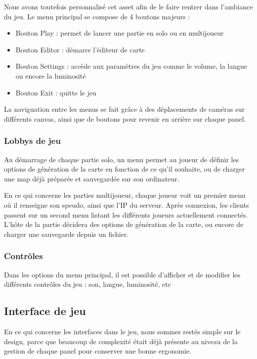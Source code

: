 \documentclass[12pt]{report}
\begin{document}
Nous avons toutefois personnalisé cet asset afin de le faire rentrer dans
l'ambiance du jeu. Le menu principal se compose de 4 boutons majeurs :

\begin{itemize}
    \item Bouton Play : permet de lancer une partie en solo ou en multijoueur
    \item Bouton Editor : démarre l'éditeur de carte
    \item Bouton Settings : accède aux paramètres du jeu comme le volume, la
        langue ou encore la luminosité
    \item Bouton Exit : quitte le jeu
\end{itemize}

La naviguation entre les menus se fait grâce à des déplacements de caméras sur
différents canvas, ainsi que de boutons pour revenir en arrière sur chaque
panel.

\subsubsection{Lobbys de jeu}

Au démarrage de chaque partie solo, un menu permet au joueur de définir les
options de génération de la carte en fonction de ce qu’il souhaite, ou de
charger une map déjà préparée et sauvegardée sur son ordinateur.

En ce qui concerne les parties multijoueur, chaque joueur voit un premier menu
où il renseigne son speudo, ainsi que l'IP du serveur. Après connexion, les
clients passent sur un second menu listant les différents joueurs actuellement
connectés. L'hôte de la partie décidera des options de génération de la carte,
ou encore de charger une sauvegarde depuis un fichier.

\subsubsection{Contrôles}

Dans les options du menu principal, il est possible d’afficher et de modifier
les différents contrôles du jeu : son, langue, luminosité, etc

\subsection{Interface de jeu}

En ce qui concerne les interfaces dans le jeu, nous sommes restés simple sur le
design, parce que beaucoup de complexité était déjà présente au niveau de la
gestion de chaque panel pour conserver une bonne ergonomie.
\end{document}
